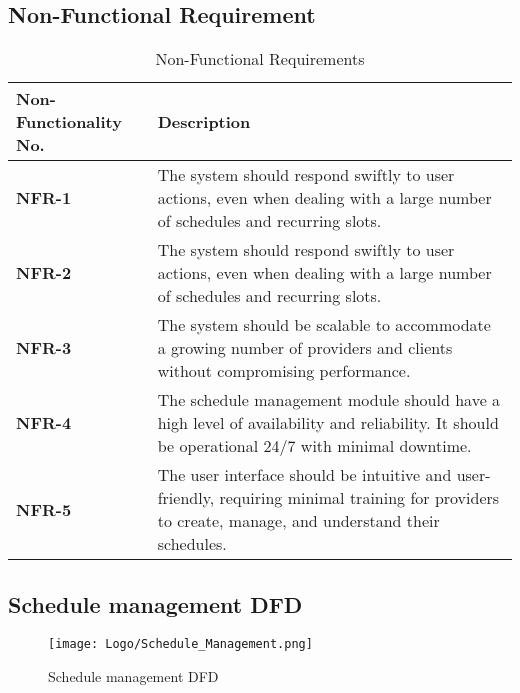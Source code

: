 \documentclass[12pt,a4paper]{article}
\begin{document}
\subsection{Non-Functional Requirement}
\begin{table}[h!]
\caption{Non-Functional Requirements}
    \centering
    \begin{tabular}{|l|p{7cm}|}
    \hline
       \textbf{Non-Functionality No.}&\textbf{Description} \\ %
       \hline
       \textbf{NFR-1}&The system should respond swiftly to user actions, even when dealing with a large number of schedules and recurring slots. \\ %
       \hline
       \textbf{NFR-2}&The system should respond swiftly to user actions, even when dealing with a large number of schedules and recurring slots.\\ %
       \hline
       \textbf{NFR-3}&The system should be scalable to accommodate a growing number of providers and clients without compromising performance.\\ %
       \hline
       \textbf{NFR-4}&The schedule management module should have a high level of availability and reliability. It should be operational 24/7 with minimal downtime.
        \\ %
       \hline
       \textbf{NFR-5}&The user interface should be intuitive and user-friendly, requiring minimal training for providers to create, manage, and understand their schedules.
       \\ %
       \hline
    \end{tabular}
\end{table}
\newpage
\subsection{Schedule management DFD}
\begin{figure}[h]
    \centering
    \texttt{[image: Logo/Schedule\_Management.png]}
    \caption{Schedule management DFD}

\end{figure}
\end{document}
